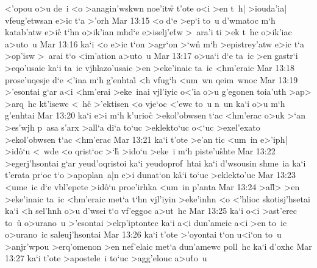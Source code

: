 <'opou
o>u
de~i
<o
>anagin'wskwn
noe'it\r{w}
t'ote
o<i
>en
t~h|
>iouda'ia|
vfeug'etwsan
e>ic
t`a
>'orh\bibvsend
\vs Mar 13:15
<o
d`e
>ep`i
to~u
d'wmatoc
m`h
katab'atw
e>ic\r{}
t`hn
o>ik'ian
mhd`e
e>iselj'e\r{t}w
>~ara'i
ti
>ek
t~hc
o>ik'iac
a>uto~u\bibvsend
\vs Mar 13:16
ka`i
<o
e>ic
t`on
>agr`on
>`w\r{n}
m`h
>epistrey'atw
e>ic
t`a
>op'isw
>~arai
t`o
<im'ation
a>uto~u\bibvsend
\vs Mar 13:17
o>ua`i
d`e
ta~ic
>en
gastr`i
>eqo'usaic
ka`i
ta~ic
vjhlazo'usaic
>en
>eke'inaic
ta~ic
<hm'eraic\bibvsend
\vs Mar 13:18
prose'uqesje
d`e
<'ina
m`h
g'enhtai\r{}
<h
vfug`h
<um~wn
qeim~wnoc\bibvsend
\vs Mar 13:19
>'esontai
g`ar
a<i
<hm'erai
>eke~inai
vjl'iyic
o<'ia
o>u
g'egonen
toia'uth
>ap>
>arq~hc
kt'isewc
<~h\r{c}
>'ektisen
<o
vje`oc
<'ewc
to~u
n~un
ka`i
o>u
m`h
g'enhtai\bibvsend
\vs Mar 13:20
ka`i
e>i
m`h
k'urioc\r{}
>ekol'obwsen
t`ac
<hm'erac
o>uk
>`an
>es'wjh
p~asa
s'arx
>all`a
di`a
to`uc
>eklekto`uc
o<`uc
>exel'exato
>ekol'obwsen
t`ac
<hm'erac\bibvsend
\vs Mar 13:21
ka`i
t'ote
>e'an
tic
<um~in
e>'iph|
>id\r{o}`u
<~wde
<o
qrist`oc
>`h\r{}
>ido`u
>eke~i
m`h
piste'u\r{s}hte\bibvsend
{}
\vs Mar 13:22
>egerj'hsontai
g`ar
yeud'oqristoi
ka`i
yeudoprof~htai
ka`i
d'wsousin
shme~ia
ka`i
t'erata
pr`oc
t`o
>apoplan~a|n
e>i
dunat`on
k\r{a}`i
to`uc
>eklekto'uc\bibvsend
\vs Mar 13:23
<ume~ic
d`e
vbl'epete
>id\r{o}`u
proe'irhka
<um~in
p'anta\bibvsend
\vs Mar 13:24
>al\r{l}>
>en
>eke'inaic
ta~ic
<hm'eraic
met`a
t`hn
vjl'iyin
>eke'inhn
<o
<'hlioc
skotisj'hsetai
ka`i
<h
sel'hnh
o>u
d'wsei
t`o
vf'eggoc
a>ut~hc\bibvsend
\vs Mar 13:25
ka`i
o<i
>ast'erec
to~u\r{}
o>urano~u
>'esontai
>ekp'iptontec
ka`i
a<i
dun'ameic
a<i
>en
to~ic
o>urano~ic
saleuj'hsontai\bibvsend
\vs Mar 13:26
ka`i
t'ote
>'oyontai
t`on
u<i`on
to~u
>anjr'wpou
>erq'omenon
>en
nef'elaic
met`a
dun'amewc
poll~hc
ka`i
d'oxhc\bibvsend
\vs Mar 13:27
ka`i
t'ote
>apostele~i
to`uc
>agg'elouc
a>u\r{t}o~u
